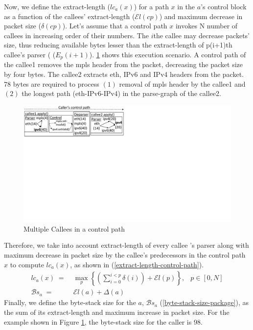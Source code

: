 \documentclass[letterpaper,twocolumn,10pt]{article}
\begin{document}
Now, we define the extract-length ($lc_{a}(x)$) for a path 
$x$ in the \uprogram $a$'s control block as a function of 
the callees' extract-length ($\mathcal{E}l(cp)$) and maximum decrease 
in packet size ($\delta(cp)$). Let's assume that a control path $x$ 
invokes N number of callees in increasing order of their numbers. 
The $i$the callee may decrease packets' size, thus reducing available 
bytes lesser than the extract-length of p(i+1)th callee's parser ( 
\uprogram ($E_{p}(i+1)$).
\cref{fig:sequential-callees} shows this execution scenario.
A control path of the callee1 removes the mpls header from the 
packet, decreasing the packet size by four bytes.
The callee2 extracts eth, IPv6 and IPv4 headers from the packet. 
78 bytes are required to process $(1)$ removal of mpls header by the 
callee1 and $(2)$ the longest path (eth-IPv6-IPv4) in the 
parse-graph of the callee2.
\begin{figure}[!h]
    \centering
    \includegraphics[trim=0 396 487 0, clip,scale=0.5]{sequential-callees}
    \caption{Multiple Callees in a control path}
    \label{fig:sequential-callees}
\end{figure}
Therefore, we take into account extract-length of every callee 
\uprogram's parser along with maximum decrease in packet size by the 
callee's predecessors in the control path $x$ to compute $lc_{a}(x)$, 
as shown in (\ref{extract-length-control-path}).
\begin{align}
lc_{a}(x) \; =& \; \max_{p} \left\{ \left( \sum_{i=0}^{i<p} \delta(i) \right)+ \mathcal{E}l(p) \right\},&p \in [0,N] \label{extract-length-control-path} \\
\mathcal{B}s_{a} \; =& \; \mathcal{E}l(a) + \Delta(a) & \label{byte-stack-size-package}
\end{align}
Finally, we define the byte-stack size for the \uprogram $a$, 
$\mathcal{B}s_{a}$ (\ref{byte-stack-size-package}), as the sum of its 
extract-length and maximum increase in packet size.
For the example shown in Figure \ref{fig:sequential-callees}, the 
byte-stack size for the caller is 98.
\end{document}

